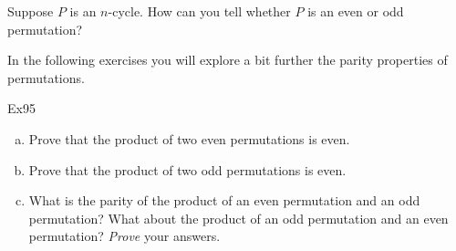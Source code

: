 \begin{exercise}{}
Suppose $P$ is an $n$-cycle.  How can you tell  whether $P$ is an even or odd permutation?
\end{exercise}


In the following exercises you will explore a bit further the parity properties of permutations. 

\begin{exercise}{Ex95}\label{ex:evenoddprod} %
\begin{enumerate}[(a)]
\item
Prove that the product of two even permutations is even.
\item
Prove that the product of two odd permutations is even.
\item
What is the parity of  the product of an even permutation and an odd permutation?  What about the product of an odd permutation and an even permutation? \emph{Prove} your answers.
\end{enumerate}
\end{exercise}
%
%
%
%
%

